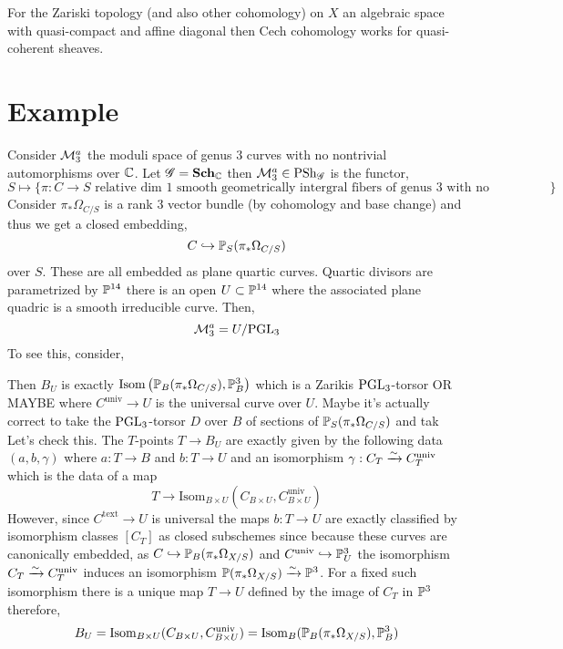 \documentclass[12pt]{article}
\begin{document}
For the Zariski topology (and also other cohomology) on $X$ an algebraic space with quasi-compact and affine diagonal then Cech cohomology works for quasi-coherent sheaves.

\section{Example}

Consider $\M^a_3$ the moduli space of genus $3$ curves with no nontrivial automorphisms over $\CC$. Let $\G = \Sch_{\CC}$ then $\M^a_3 \in \PSh_\G$ is the functor,
\[ S \mapsto \{ \pi :  C \to S \text{ relative dim 1 smooth geometrically intergral fibers of genus 3 with no automorphisms} \} \]
Consider $\pi_* \Omega_{C/S}$ is a rank $3$ vector bundle (by cohomology and base change) and thus we get a closed embedding,
\[ C \embed \P_S(\pi_* \Omega_{C/S}) \]
over $S$. These are all embedded as plane quartic curves. Quartic divisors are parametrized by $\P^{14}$ there is an open $U \subset \P^{14}$ where the associated plane quadric is a smooth irreducible curve. Then,
\[ \M^a_{3} = U / \PGL_{3} \]
To see this, consider,
\begin{center}
\end{center}
Then $B_U$ is exactly $\Isom{\P_B(\pi_* \Omega_{C/S})}{\P^3_B}$ which is a Zarikis $\PGL_3$-torsor OR MAYBE where $C^{\text{univ}} \to U$ is the universal curve over $U$. Maybe it's actually correct to take the $\PGL_3$-torsor $D$ over $B$ of sections of $\P_S(\pi_* \Omega_{C/S})$ and tak
\bigskip\\
Let's check this. The $T$-points $T \to B_U$ are exactly given by the following data $(a, b, \gamma)$ where $a : T \to B$ and $b : T \to U$ and an isomorphism $\gamma : C_T \iso C^{\text{univ}}_T$ which is the data of a map 
\[ T \to \mathrm{Isom}_{B \times U}(C_{B \times U}, C^{\text{univ}}_{B \times U}) \]
However, since $C^{\text{text}} \to U$ is universal the maps $b : T \to U$ are exactly classified by isomorphism classes $[C_T]$ as closed subschemes since because these curves are canonically embedded, as $C \embed \P_B(\pi_* \Omega_{X/S})$ and $C^{\text{univ}} \embed \P^3_U$ the isomorphism $C_T \iso C_T^{\text{univ}}$ induces an isomorphism $\P(\pi_* \Omega_{X/S}) \iso \P^3$. For a fixed such isomorphism there is a unique map $T \to U$ defined by the image of $C_T$ in $\P^3$ therefore,
\[ B_U = \mathrm{Isom}_{B \times U}(C_{B \times U}, C^{\text{univ}}_{B \times U}) = \mathrm{Isom}_{B}(\P_B(\pi_* \Omega_{X/S}), \P^3_B) \]
\end{document}
